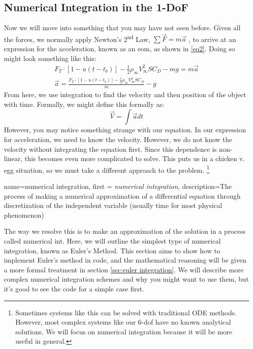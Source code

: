 \documentclass[12pt]{report}
\begin{document}
\subsection{Numerical Integration in the 1-DoF}\label{sec: Numerical Integration in the 1DoF}
Now we will move into something that you may have not seen before. Given all the forces, we normally apply Newton’s 2\textsuperscript{nd} Law, $\sum{\vec{F}}=m\vec{a}$ , to arrive at an expression for the acceleration, known as an \gls{eom}, as shown in \eqref{eq2}. Doing so might look something like this:
\begin{gather}
F_T \cdot [1-u(t-t_b)]-\frac{1}{2}\rho_{\infty}V_{\infty}^2SC_D-mg=m\vec{a}\label{eq1} \\
\vec{a}=\frac{F_T \cdot [1-u(t-t_b)]-\frac{1}{2}\rho_{\infty}V_{\infty}^2SC_D}{m}-g\label{eq2}
\end{gather}
 From here, we use integration to find the velocity and then position of the object with time. Formally, we might define this formally as:
 $$\vec{V}=\int{\vec{a}}{dt}$$
However, you may notice something strange with our equation. In our expression for acceleration, we need to know the velocity. However, we do not know the velocity without integrating the equation first. Since this dependence is non-linear, this becomes even more complicated to solve. This puts us in a chicken v. egg situation, so we must take a different approach to the problem. \footnote{Sometimes systems like this can be solved with traditional ODE methods. However, most complex systems like our 6-\gls{dof} have no known analytical solutions. We will focus on numerical integration because it will be more useful in general. }

{
    name=numerical integration,
    first = {\textit{numerical integration}},
    description={The process of making a numerical approximation of a differential equation through discretization of the independent variable (usually time for most physical phenomenon)}
}

The way we resolve this is to make an approximation of the solution in a process called \gls{numerical int}. Here, we will outline the simplest type of numerical integration, known as Euler’s Method. This section aims to show how to implement Euler’s method in code, and the mathematical reasoning will be given a more formal treatment in section \ref{sec:euler integration}. We will describe more complex numerical integration schemes and why you might want to use them, but it’s good to see the code for a simple case first.
\end{document}

